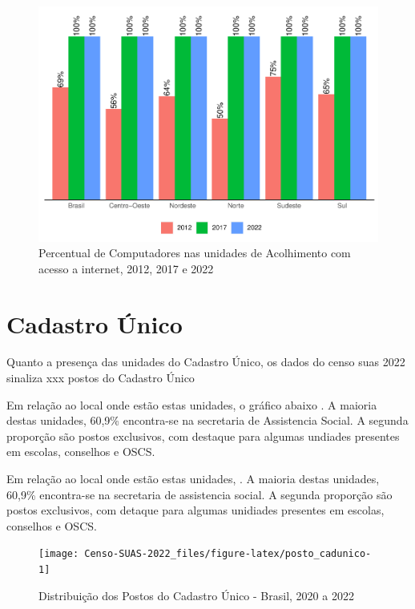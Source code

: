 \documentclass[
  brazilian]{report}
\begin{document}
\begin{figure}
\includegraphics{Censo-SUAS-2022_files/figure-latex/unac-internet-1} \caption[Percentual de Computadores nas unidades de Acolhimento com acesso a internet, 2012, 2017 e 2022]{Percentual de Computadores nas unidades de Acolhimento com acesso a internet, 2012, 2017 e 2022}\label{fig:unac-internet}
\end{figure}

\hypertarget{cadastro-uxfanico}{%
\section{Cadastro Único}\label{cadastro-uxfanico}}

Quanto a presença das unidades do Cadastro Único, os dados do censo suas
2022 sinaliza xxx postos do Cadastro Único

Em relação ao local onde estão estas unidades, o gráfico abaixo
. A maioria destas unidades, 60,9\% encontra-se
na secretaria de Assistencia Social. A segunda proporção são postos
exclusivos, com destaque para algumas undiades presentes em escolas,
conselhos e OSCS.

Em relação ao local onde estão estas unidades,
. A maioria destas unidades, 60,9\% encontra-se
na secretaria de assistencia social. A segunda proporção são postos
exclusivos, com detaque para algumas unidiades presentes em escolas,
conselhos e OSCS.

\begin{figure}
\texttt{[image: Censo-SUAS-2022\_files/figure-latex/posto\_cadunico-1]} \caption[Distribuição dos Postos do Cadastro Único - Brasil, 2020 a 2022]{Distribuição dos Postos do Cadastro Único - Brasil, 2020 a 2022}\label{fig:posto_cadunico}
\end{figure}
\end{document}
